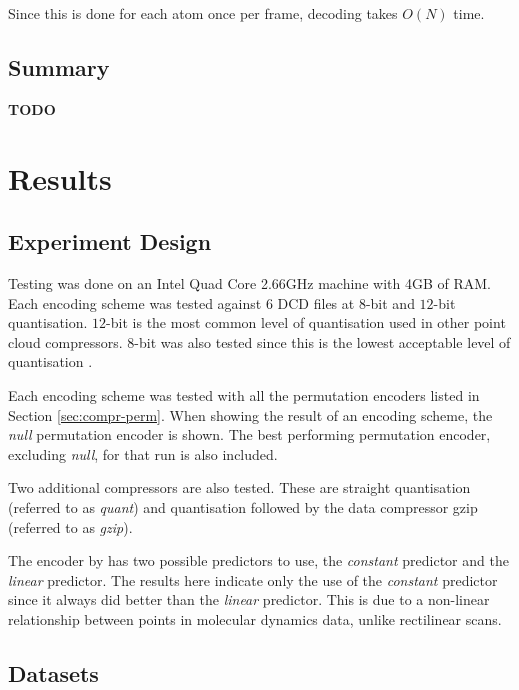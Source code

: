 \documentclass[a4paper]{report}
\newcommand{\todo}{\textbf{TODO} }
\begin{document}
Since this is done for each atom once per frame, decoding takes $O(N)$ time.


\section{Summary}

\todo


\chapter{Results}

\section{Experiment Design}

Testing was done on an Intel Quad Core 2.66GHz machine with 4GB of RAM. Each
encoding scheme was tested against 6 DCD files at $8$-bit and $12$-bit
quantisation. $12$-bit is the most common level of quantisation used in other
point cloud compressors. $8$-bit was also tested since this is the lowest
acceptable level of quantisation \citep{minvis}.

Each encoding scheme was tested with all the permutation encoders listed in
Section \ref{sec:compr-perm}. When showing the result of an encoding scheme,
the \emph{null} permutation encoder is shown. The best performing permutation
encoder, excluding \emph{null}, for that run is also included.

Two additional compressors are also tested. These are straight quantisation
(referred to as \emph{quant}) and quantisation followed by the data compressor
gzip (referred to as \emph{gzip}).

The encoder by \citet{gumholdcomp} has two possible predictors to use, the
\emph{constant} predictor and the \emph{linear} predictor. The results here
indicate only the use of the \emph{constant} predictor since it always did
better than the \emph{linear} predictor. This is due to a non-linear
relationship between points in molecular dynamics data, unlike rectilinear
scans.

\section{Datasets}
\end{document}
